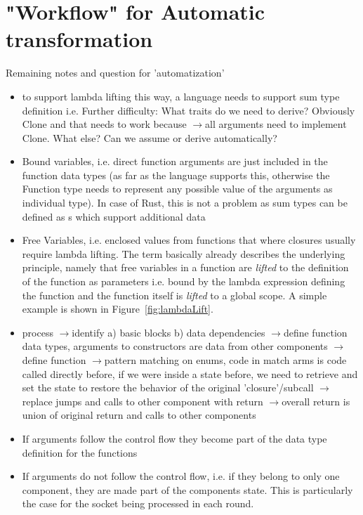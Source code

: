 \documentclass{scrartcl}
\newcommand{\means}{$\rightarrow{}$}
\begin{document}
\section{"Workflow" for Automatic transformation}
Remaining notes and question for 'automatization'
\begin{itemize}
    \item to support lambda lifting this way, a language needs to support sum type definition i.e.
    Further difficulty: What traits do we need to derive? Obviously Clone and that needs to work because \means all arguments need to implement Clone. What else? Can we assume or derive automatically? 
    \item Bound variables, i.e. direct function arguments are just included in the function data types (as far as the language supports this, otherwise the Function type needs to represent any possible value of the arguments as individual type). In case of Rust, this is not a problem as sum types can be defined as s which support additional data
    \item Free Variables, i.e. enclosed values from functions that where closures usually require lambda lifting. The term basically already describes the underlying principle, namely that free variables in a function are \emph{lifted} to the definition of the function as parameters i.e. bound by the lambda expression defining the function and the function itself is \emph{lifted} to a global scope. A simple example is shown in Figure~\ref{fig:lambdaLift}.
    \item process \means identify a) basic blocks b) data dependencies \means define function data types, arguments to constructors are data from other components \means define  function \means pattern matching on enums, code in match arms is code called directly before, if we were inside a state before, we need to retrieve and set the state to restore the behavior of the original 'closure'/subcall \means replace jumps and calls to other component with return \means overall return is union of original return and calls to other components
    \item If arguments follow the control flow they become part of the data type definition for the functions
    \item If arguments do not follow the control flow, i.e. if they belong to only one component, they are made part of the components state. This is particularly the case for the socket being processed in each round.

\end{itemize}
\end{document}
